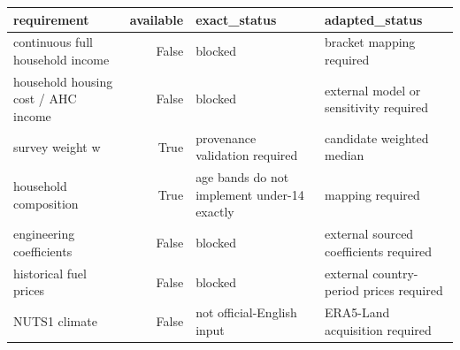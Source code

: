\begin{tabular}{lrll}
\toprule
requirement & available & exact_status & adapted_status \\
\midrule
continuous full household income & False & blocked & bracket mapping required \\
household housing cost / AHC income & False & blocked & external model or sensitivity required \\
survey weight w & True & provenance validation required & candidate weighted median \\
household composition & True & age bands do not implement under-14 exactly & mapping required \\
engineering coefficients & False & blocked & external sourced coefficients required \\
historical fuel prices & False & blocked & external country-period prices required \\
NUTS1 climate & False & not official-English input & ERA5-Land acquisition required \\
\bottomrule
\end{tabular}

